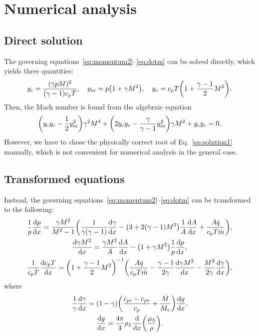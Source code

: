 \documentclass{article}
\newcommand{\vap}{\text{v}}
\newcommand{\con}{\text{c}}
\begin{document}
\section{Numerical analysis}

\subsection{Direct solution}

The governing equations~\eqref{eq:momentum2}--\eqref{eq:dotm} can be solved directly, which yields three quantities:
\begin{equation}\label{eq:solution1}
    y_c = \frac{(\gamma pM)^2}{(\gamma-1)c_pT}, \quad
    y_m = p\qty(1 + \gamma M^2), \quad
    y_e = c_pT\qty(1 + \frac{\gamma-1}{2}M^2).
\end{equation}
Then, the Mach number is found from the algebraic equation
\begin{equation}\label{eq:solution1}
    \qty(y_c y_e - \frac12y_m^2)\gamma^2M^4 + \qty(2y_c y_e - \frac{\gamma}{\gamma-1}y_m^2)\gamma M^2 + y_cy_e = 0.
\end{equation}
However, we have to chose the physically correct root of Eq.~\eqref{eq:solution1} manually,
which is not convenient for numerical analysis in the general case.

\subsection{Transformed equations}

Instead, the governing equations~\eqref{eq:momentum2}--\eqref{eq:dotm} can be transformed to the following:
\begin{gather}
    \frac1p\dv{p}{x} = \frac{\gamma M^2}{M^2 - 1}
        \qty( \frac1{\gamma(\gamma-1)}\dv{\gamma}{x} - \qty(3 + 2(\gamma-1)M^2)\frac1A\dv{A}{x}
            + \frac{A\dot{q}}{c_pT\dot{m}}), \label{eq:p}\\
    \dv{\gamma M^2}{x} =
        \frac{\gamma M^2}{A}\dv{A}{x} - \qty(1 + \gamma M^2)\frac1p\dv{p}{x}, \label{eq:Ma}\\
    \frac1{c_pT}\dv{c_pT}{x} = \qty(1+\frac{\gamma-1}{2}M^2)^{-1}
        \qty(\frac{A\dot{q}}{c_pT\dot{m}} - \frac{\gamma-1}{2\gamma}\dv{\gamma M^2}{x}
            - \frac{M^2}{2\gamma}\dv{\gamma}{x}), \label{eq:T}
\end{gather}
where
\begin{gather}
    \frac1\gamma\dv{\gamma}{x}
        = (1-\gamma)\qty(\frac{c_{p\con} - c_{p\vap}}{c_p} + \frac{\bar{M}}{M_\vap})\dv{g}{x}, \label{eq:gamma_prime}\\
    \dv{g}{x} = \frac{4\pi}{3}\rho_L\dv{x}(\frac{\mu_3}{\rho}). \label{eq:g_prime}
\end{gather}

\end{document}

